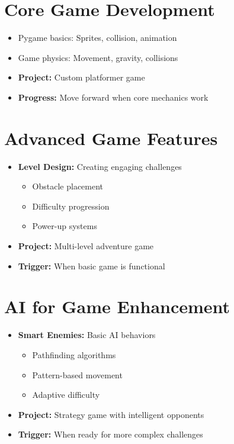 \documentclass{article}
\begin{document}
\section{Core Game Development}
\begin{itemize}[nosep]
    \item Pygame basics: Sprites, collision, animation
    \item Game physics: Movement, gravity, collisions
    \item \textbf{Project:} Custom platformer game
    \item \textbf{Progress:} Move forward when core mechanics work
\end{itemize}

\section{Advanced Game Features}
\begin{itemize}[nosep]
    \item \textbf{Level Design:} Creating engaging challenges
    \begin{itemize}
        \item Obstacle placement
        \item Difficulty progression
        \item Power-up systems
    \end{itemize}
    \item \textbf{Project:} Multi-level adventure game
    \item \textbf{Trigger:} When basic game is functional
\end{itemize}

\section{AI for Game Enhancement}
\begin{itemize}[nosep]
    \item \textbf{Smart Enemies:} Basic AI behaviors
    \begin{itemize}
        \item Pathfinding algorithms
        \item Pattern-based movement
        \item Adaptive difficulty
    \end{itemize}
    \item \textbf{Project:} Strategy game with intelligent opponents
    \item \textbf{Trigger:} When ready for more complex challenges
\end{itemize}
\end{document}
